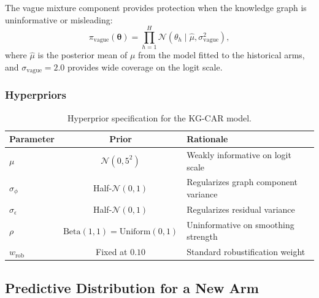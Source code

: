 \documentclass[12pt]{article}
\newcommand{\btheta}{\boldsymbol{\theta}}
\begin{document}
The vague mixture component provides protection when the knowledge graph is uninformative or misleading:
\begin{equation}
\label{eq:vague}
\pi_{\text{vague}}(\btheta) = \prod_{h=1}^{H} \mathcal{N}(\theta_h \mid \hat{\mu}, \sigma_{\text{vague}}^2),
\end{equation}
where $\hat{\mu}$ is the posterior mean of $\mu$ from the model fitted to the historical arms, %
and $\sigma_{\text{vague}} = 2.0$ provides wide coverage on the logit scale.

\subsubsection{Hyperpriors}

\begin{table}[ht]
\centering
\caption{Hyperprior specification for the KG-CAR model.}
\label{tab:hyperpriors}
\begin{tabular}{lcl}
\toprule
Parameter & Prior & Rationale \\
\midrule
$\mu$ & $\mathcal{N}(0, 5^2)$ & Weakly informative on logit scale \\
$\sigma_\phi$ & Half-$\mathcal{N}(0, 1)$ & Regularizes graph component variance \\
$\sigma_\epsilon$ & Half-$\mathcal{N}(0, 1)$ & Regularizes residual variance \\
$\rho$ & $\text{Beta}(1, 1) = \text{Uniform}(0,1)$ & Uninformative on smoothing strength \\
$w_{\text{rob}}$ & Fixed at $0.10$ & Standard robustification weight \\
\bottomrule
\end{tabular}
\end{table}

\subsection{Predictive Distribution for a New Arm}
\label{sec:loo_prediction}
\end{document}
